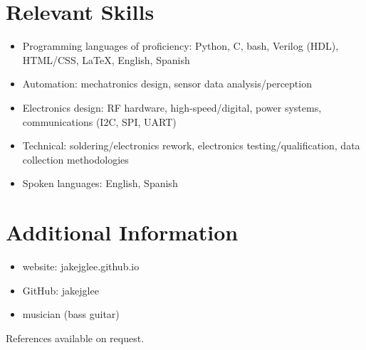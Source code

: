 \documentclass[12pt, letterpaper]{article}
\begin{document}
	\section*{Relevant Skills}
	\begin{flushleft}
		\begin{itemize}
			\item Programming languages of proficiency: Python, C, bash, Verilog (HDL), HTML/CSS, \LaTeX, English, Spanish
			\item Automation: mechatronics design, sensor data analysis/perception
			\item Electronics design: RF hardware, high-speed/digital, power systems, communications (I2C, SPI, UART)
			\item Technical: soldering/electronics rework, electronics testing/qualification, data collection methodologies
			\item Spoken languages: English, Spanish
		\end{itemize}
	\end{flushleft}
	\section*{Additional Information}
	\begin{flushleft}
		\begin{itemize}
			\item website: jakejglee.github.io
			\item GitHub: jakejglee
			\item musician (bass guitar)
		\end{itemize}
	\end{flushleft}
	References available on request.
\end{document}
